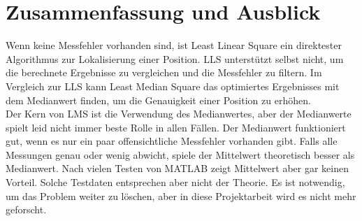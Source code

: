 \section{Zusammenfassung und Ausblick}
Wenn keine Messfehler vorhanden sind, ist Least Linear Square ein direktester Algorithmus zur Lokalisierung einer Position. LLS unterstützt selbst nicht, um die berechnete Ergebnisse zu vergleichen und die Messfehler zu filtern. Im Vergleich zur LLS kann Least Median Square das optimiertes Ergebnisses mit dem Medianwert finden, um die Genauigkeit einer Position zu erhöhen.\\
Der Kern von LMS ist die Verwendung des Medianwertes, aber der Medianwerte spielt leid nicht immer beste Rolle in allen Fällen. Der Medianwert funktioniert gut, wenn es nur ein paar offensichtliche Messfehler vorhanden gibt. Falls alle Messungen genau oder wenig abwicht, spiele der Mittelwert theoretisch besser als Medianwert. Nach vielen Testen von MATLAB zeigt Mittelwert aber gar keinen Vorteil. Solche Testdaten entsprechen aber nicht der Theorie. Es ist notwendig, um das Problem weiter zu löschen, aber in diese Projektarbeit wird es nicht mehr geforscht.
